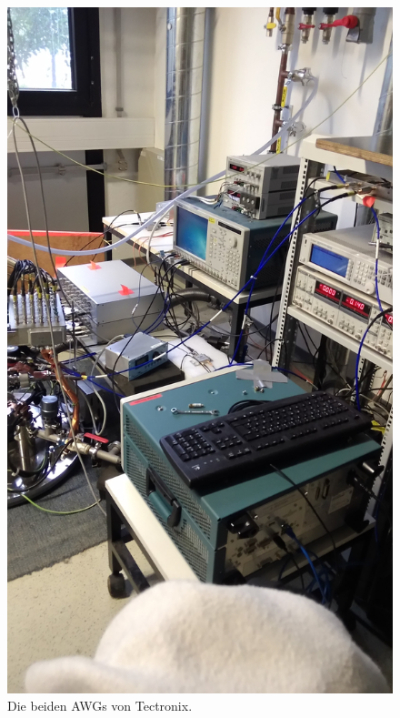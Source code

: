 \documentclass[DIN, pagenumber=false, fontsize=11pt]{scrartcl}
\begin{document}
\begin{figure}[h]
\begin{center}
 \includegraphics[width=\textheight,angle=270]{pictures/P_20150225_143557.jpg} \qquad
 \caption{Die beiden AWGs von Tectronix.}
\end{center}
\end{figure}
\end{document}
